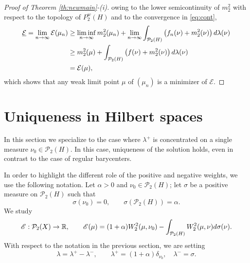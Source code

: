\documentclass[12pt,a4paper]{article}
\newcommand{\R}{\mathbb{R}}
\renewcommand{\P}{\mathcal{P}}
\renewcommand{\d}{{\rm d}}
\newcommand{\X}{\mathcal{P}_2(H)}
\theoremstyle{plain}
\theoremstyle{definition}
\begin{document}
\begin{proof}[Proof of Theorem \ref{th:newmain}-(i)]
owing to the lower semicontinuity of $m_2^2$ with respect to the topology of $P_2^w(H)$ and to the convergence in \eqref{eq:cont},
\begin{align*}
	\underline{\mathcal{E}}=\lim_{n\to \infty}\mathcal{E}(\mu_n) &\geq \liminf_{n\to \infty} m_2^2(\mu_n) +\lim_{n\to \infty}\int_{\X} \left(f_n(\nu) + m_2^2(\nu) \right)\d\lambda(\nu)\\
		&\geq m_2^2(\mu) +\int_{\X} \left(f(\nu) + m_2^2(\nu) \right)\d\lambda(\nu)\\
		&=\mathcal{E}(\mu),
\end{align*}
which shows that any weak limit point $\mu$ of $(\mu_n)$ is a minimizer of $\mathcal E$.
\end{proof}



\section{Uniqueness in Hilbert spaces}
\label{sec:unique}

In this section we specialize to the case where $\lambda^+$ is concentrated on a single measure $\nu_0\in\X$. In this case, uniqueness of the solution holds, even in contrast to the case of regular barycenters. 

In order to highlight the different role of the positive and negative weights, we use the following notation. Let $\alpha>0$ and $\nu_0\in \X$; let $\sigma$ be a positive measure on $\X$ such that 
\[
	\sigma(\nu_0)=0,\qquad \sigma(\X)=\alpha.
\]
We study 
\begin{equation}
\label{def:onepos}
	\mathscr{E}: \P_2(X) \to \R,\qquad \mathscr{E}(\mu) = (1+\alpha) W_2^2(\mu, \nu_0) - \int_{\X}  W_2^2(\mu, \nu)\d\sigma(\nu).
\end{equation}
With respect to the notation in the previous section, we are setting 
\[
	\lambda = \lambda^+-\lambda^-,\qquad \lambda^+=(1+\alpha)\delta_{\nu_0},\quad \lambda^-=\sigma.
\]	
\end{document}
